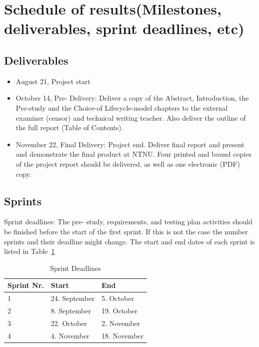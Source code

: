 \documentclass[10pt,a4paper,oneside]{report}
\begin{document}
\section{Schedule of results(Milestones, deliverables, sprint deadlines, etc)}

\subsection {Deliverables}

\begin {itemize}

\item August 21, Project start

\item October 14, Pre- Delivery: Deliver a copy of the Abstract, Introduction, the Pre-study and the Choice-of Lifecycle-model chapters to the external examiner (censor) and technical writing teacher. Also deliver the outline of the full report (Table of  Contents).

\item November 22, Final Delivery: Project end. Deliver final report and present and demonstrate the final product at NTNU. Four printed and bound copies of  the project report should be delivered, as well as one electronic (PDF) copy.

\end {itemize}

\subsection {Sprints}

Sprint deadlines:
The pre- study, requirements, and testing plan activities should be finished before the start of the first sprint. If this is not the case the number sprints and their deadline might change. The start and end dates of each sprint is listed in Table~\ref{table:sprintdeadlines}

\begin{table}
\caption{Sprint Deadlines}
\centering
\begin{tabular}{ l l l }
\hline
Sprint Nr.		&Start		&End		\\
\hline
1		&24. September		&5. October		\\
2		&8. September			&19. October		\\
3		&22. October			&2. November		\\
4		&4. November			&18. November	\\
\hline
\end{tabular}
\label{table:sprintdeadlines}
\end{table}
\end{document}
